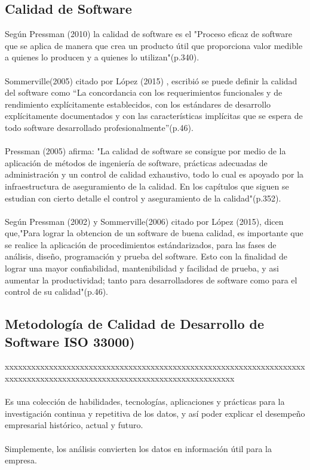 \documentclass[preprint,12pt]{elsarticle}
\begin{document}
	\subsection{\textbf{Calidad de Software}}
Según Pressman (2010) la calidad de software es el "Proceso eficaz de software que se aplica de manera que crea un producto útil que proporciona valor medible a quienes lo producen y a quienes lo utilizan"(p.340).\cite{referenciatorres1}
\\
\\
Sommerville(2005) citado por López (2015) , escribió se puede definir la calidad del software como “La concordancia con los requerimientos funcionales y de rendimiento explícitamente establecidos, con los estándares de desarrollo explícitamente documentados y con las características implícitas que se espera de todo software desarrollado profesionalmente”(p.46).\cite{referenciatorres2}
\\
\\
Pressman (2005) afirma: "La calidad de software se consigue por medio de la aplicación de métodos de ingeniería de software, prácticas adecuadas de administración y un control de calidad exhaustivo, todo lo cual es apoyado por la infraestructura de aseguramiento de la calidad. En los capítulos que siguen se estudian con cierto detalle el control y aseguramiento de la calidad"(p.352).\cite{referenciatorres1}
\\
\\
Según Pressman (2002) y Sommerville(2006) citado por López (2015), dicen que,"Para lograr la obtencion de un software de buena calidad, es importante que se realice la aplicación de procedimientos estándarizados, para las fases de análisis, diseño, programación y prueba del software. Esto con la finalidad de lograr una mayor confiabilidad, mantenibilidad y facilidad de prueba, y asi aumentar la productividad; tanto para desarrolladores de software como para el control de su calidad"(p.46).\cite{referenciatorres2}
\\

	\subsection{\textbf{Metodología de Calidad de Desarrollo de Software ISO 33000) }}
	xxxxxxxxxxxxxxxxxxxxxxxxxxxxxxxxxxxxxxxxxxxxxxxxxxxxxxxxxxxxxxxxxxxxxxxxxxxxxxxxxxxxxxxxxxxxxxxxxxxxxxxxxxxxxxxxxxxxxxxx \\\\
Es una colección de habilidades, tecnologías, aplicaciones y prácticas para la investigación continua y repetitiva de los datos, y así poder explicar el desempeño empresarial histórico, actual y futuro. \\
\\Simplemente, los análisis convierten los datos en información útil para la empresa.
\end{document}
